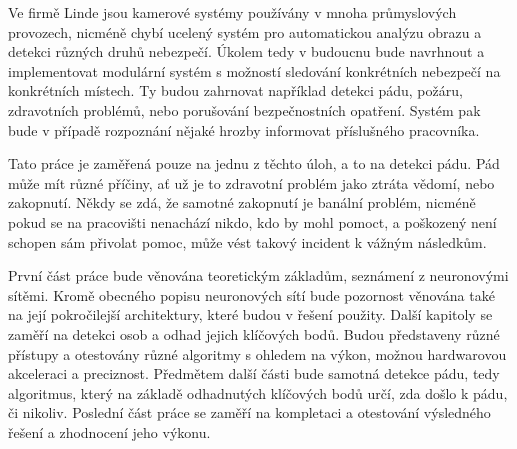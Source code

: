 Ve firmě Linde jsou kamerové systémy používány v mnoha průmyslových provozech,
nicméně chybí ucelený systém pro automatickou analýzu obrazu a detekci různých
druhů nebezpečí. Úkolem tedy v budoucnu bude navrhnout a implementovat
modulární systém s možností sledování konkrétních nebezpečí na konkrétních
místech. Ty budou zahrnovat například detekci pádu, požáru, zdravotních
problémů, nebo porušování bezpečnostních opatření. Systém pak bude v případě
rozpoznání nějaké hrozby informovat příslušného pracovníka.

Tato práce je zaměřená pouze na jednu z těchto úloh, a to na detekci pádu. Pád
může mít různé příčiny, ať už je to zdravotní problém jako ztráta vědomí, nebo
zakopnutí. Někdy se zdá, že samotné zakopnutí je banální problém, nicméně pokud
se na pracovišti nenachází nikdo, kdo by mohl pomoct, a poškozený není schopen
sám přivolat pomoc, může vést takový incident k vážným následkům.

První část práce bude věnována teoretickým základům, seznámení z neuronovými
sítěmi. Kromě obecného popisu neuronových sítí bude pozornost věnována také na
její pokročilejší architektury, které budou v řešení použity. Další kapitoly se
zaměří na detekci osob a odhad jejich klíčových bodů. Budou představeny různé
přístupy a otestovány různé algoritmy s ohledem na výkon, možnou hardwarovou
akceleraci a preciznost. Předmětem další části bude samotná detekce pádu, tedy
algoritmus, který na základě odhadnutých klíčových bodů určí, zda došlo k pádu,
či nikoliv. Poslední část práce se zaměří na kompletaci a otestování výsledného
řešení a zhodnocení jeho výkonu.

\endinput